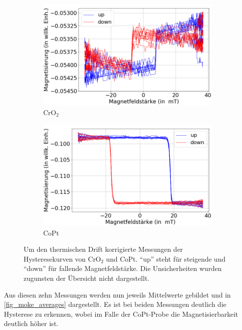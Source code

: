 \begin{figure}[H]
    \centering
    \begin{subfigure}{0.495\textwidth}
        \centering
        \includegraphics[width=1.1\textwidth]{plots/swp_all_magn_cro}
    \caption{CrO$_2$}
    \end{subfigure}
    \begin{subfigure}{0.495\textwidth}
        \centering
        \includegraphics[width=1.1\textwidth]{plots/swp_all_magn_copt}
        \caption{CoPt}
    \end{subfigure}
    \caption{Um den thermischen Drift korrigierte Messungen der Hysteresekurven von CrO$_2$ und CoPt. \enquote{up} steht für steigende und \enquote{down} für fallende Magnetfeldstärke. Die Unsicherheiten wurden zugunsten der Übersicht nicht dargestellt.}
    \label{fig_moke_einzeln}
\end{figure}

Aus diesen zehn Messungen werden nun jeweils Mittelwerte gebildet und in \cref{fig_moke_averages} dargestellt.
Es ist bei beiden Messungen deutlich die Hysterese zu erkennen, wobei im Falle der CoPt-Probe die Magnetisierbarkeit deutlich höher ist.


